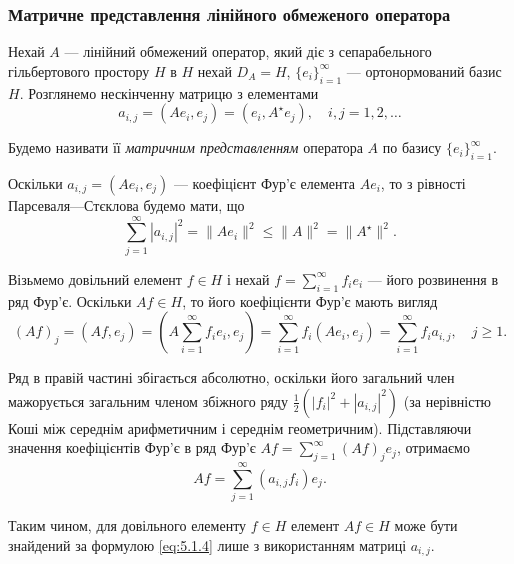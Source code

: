 \subsubsection{Матричне представлення лінійного обмеженого оператора}

Нехай $A$ --- лінійний обмежений оператор, який діє з сепарабельного гільбертового простору $H$ в $H$ нехай $D_A = H$, $\{e_i\}_{i = 1}^\infty$ --- ортонормований базис $H$. Розглянемо нескінченну матрицю з елементами
\begin{equation}
    \label{eq:5.1.1}
    a_{i,j} = (A e_i, e_j) = (e_i, A^\star e_j), \quad i, j = 1, 2, \ldots
\end{equation}

\begin{definition}
    Будемо називати її \emph{матричним представленням} оператора $A$ по базису $\{e_i\}_{i = 1}^\infty$.
\end{definition}

Оскільки $a_{i,j} = (A e_i, e_j)$ --- коефіцієнт Фур'є елемента $A e_i$, то з рівності Парсеваля---Стєклова будемо мати, що
\begin{equation}
    \label{eq:5.1.2}
    \sum_{j = 1}^\infty |a_{i, j}|^2 = \|A e_i\|^2 \le \|A\|^2 = \|A^\star\|^2.
\end{equation}

Візьмемо довільний елемент $f \in H$ і нехай $f = \sum_{i = 1}^\infty f_i e_i$ --- його розвинення в ряд Фур'є. Оскільки $A f \in H$, то його коефіцієнти Фур'є мають вигляд
\begin{equation}
    \label{eq:5.1.3}
    (A f)_j = (Af, e_j) = \left( A \sum_{i = 1}^\infty f_i e_i, e_j \right) = \sum_{i = 1}^\infty f_i (A e_i, e_j) = \sum_{i = 1}^\infty f_i a_{i,j}, \quad j \ge 1.
\end{equation}

Ряд в правій частині збігається абсолютно, оскільки його загальний член мажорується загальним членом збіжного ряду $\frac{1}{2} (|f_i|^2 + |a_{i,j}|^2)$ (за нерівністю Коші між середнім арифметичним і середнім геометричним). Підставляючи
значення коефіцієнтів Фур'є в ряд Фур'є $A f = \sum_{j = 1}^\infty (A f)_j e_j$, отримаємо
\begin{equation}
    \label{eq:5.1.4}
    A f = \sum_{j = 1}^\infty \left( a_{i,j} f_i \right) e_j.
\end{equation}

Таким чином, для довільного елементу $f \in H$ елемент $A f \in H$ може бути знайдений за формулою \eqref{eq:5.1.4} лише з використанням матриці $a_{i, j}$.

